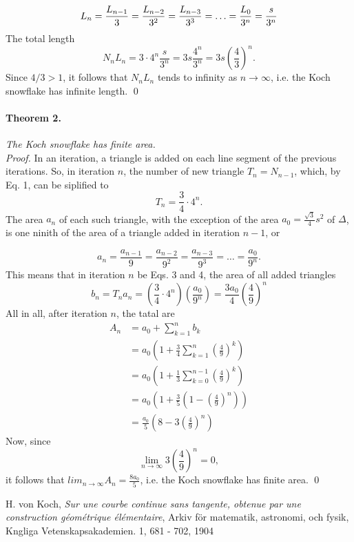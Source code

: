 \documentclass[a4paper]{article}
\begin{document}
\begin{equation}
	L_n = \frac {L_{n-1}} {3} = \frac {L_{n - 2}} {3^2} = \frac {L_{n - 3}} {3^3} = \ldots = 
		\frac{L_0} {3^n} = \frac s {3^n}
\end{equation}
The total length
$$
	N_nL_n = 3 \cdot 4^n \frac s {3^n} = 3s \frac {4^n} {3^n} = 3s \left (
		\frac 4 3
	\right )^n.
$$
Since $4 / 3 > 1$, it follows that $N_nL_n$ tends to infinity as
$n \to \infty$, i.e. the Koch snowflake has infinite length. 
\hfill \qed
\paragraph{Theorem 2.} \emph{The Koch snowflake has finite area.}\\
\emph{Proof.} In an iteration, a triangle is added on each line segment of the
previous iterations. So, in iteration $n$, the number of new triangle
$T_n = N_{n-1}$, which, by Eq. 1, can be siplified to
\begin{equation}
	T_n = \frac 3 4 \cdot 4^n.
\end{equation}
The area $a_n$ of each such triangle, with the exception of the area
$a_0 = \frac {\sqrt 3} 4 s^2$ of $\Delta$, is one ninith of the area of a 
triangle added in iteration $n - 1$, or

\begin{equation}
	a_n = \frac {a_{n-1}} {9}
		= \frac {a_{n-2}} {9^2}
		= \frac {a_{n-3}} {9^3}
		= \ldots
		= \frac {a_0} {9^n}.
\end{equation}
This means that in iteration $n$ be Eqs. 3 and 4, the area of all added
triangles
$$
	b_n = T_na_n = \left (
		\frac 3 4 \cdot 4^n
	\right )
	\left (
		\frac {a_0} {9^n}
	\right ) = \frac {3a_0} 4 \left (
	\frac 4 9
	\right )^n
$$
All in all, after iteration $n$, the tatal are 
\newcommand{\ubersum}[2] {
	\sum_{k=#2}^{n#1}
}
\begin{align*}
	A_n &= a_0 + \ubersum{}{1} b_k \\
		&= a_0 \left (
				1 + \frac 3 4 \ubersum{}{1}\left(\frac 4 9 \right )^k
			\right ) \\
		&= a_0 \left (
				1 + \frac 1 3 \ubersum{-1}{0}\left(\frac 4 9 \right )^k
			\right ) \\
		&= a_0 \left (
				1 + \frac 3 5 \left ( 1 - \left( \frac 4 9 \right )^n \right )
			\right ) \\
		&= \frac {a_0} 5 \left (
				8 - 3 \left ( \frac 4 9 \right )^n
			\right )
\end{align*}
Now, since
$$
	\lim_{n \to \infty} 3 \left ( \frac 4 9 \right )^n = 0,
$$
it follows that $lim_{n \to \infty} A_n = \frac {8a_0} 5$, i.e. the Koch 
snowflake has finite area. \hfill \qed

\begin{thebibliography}{9}
		H. von Koch,
		\emph{Sur une courbe continue sans tangente, obtenue par une
		construction géométrique élémentaire},
		Arkiv för matematik, astronomi, och fysik, Kngliga Vetenskapsakademien.
		1,
		681 - 702,
		1904
\end{thebibliography}


\end{document}
